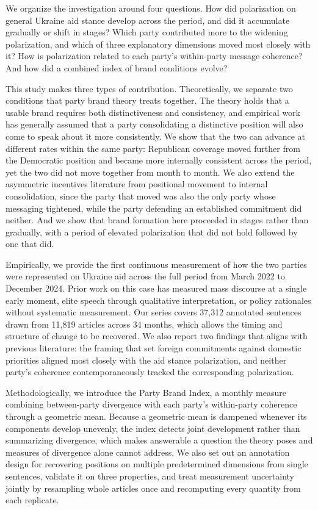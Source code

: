 We organize the investigation around four questions. How did polarization on general Ukraine aid stance develop across the period, and did it accumulate gradually or shift in stages? Which party contributed more to the widening polarization, and which of three explanatory dimensions moved most closely with it? How is polarization related to each party's within-party message coherence? And how did a combined index of brand conditions evolve?

This study makes three types of contribution. Theoretically, we separate two conditions that party brand theory treats together. The theory holds that a usable brand requires both distinctiveness and consistency, and empirical work has generally assumed that a party consolidating a distinctive position will also come to speak about it more consistently. We show that the two can advance at different rates within the same party: Republican coverage moved further from the Democratic position and became more internally consistent across the period, yet the two did not move together from month to month. We also extend the asymmetric incentives literature from positional movement to internal consolidation, since the party that moved was also the only party whose messaging tightened, while the party defending an established commitment did neither. And we show that brand formation here proceeded in stages rather than gradually, with a period of elevated polarization that did not hold followed by one that did.

Empirically, we provide the first continuous measurement of how the two parties were represented on Ukraine aid across the full period from March 2022 to December 2024. Prior work on this case has measured mass discourse at a single early moment, elite speech through qualitative interpretation, or policy rationales without systematic measurement. Our series covers 37,312 annotated sentences drawn from 11,819 articles across 34 months, which allows the timing and structure of change to be recovered. We also report two findings that aligns with previous literature: the framing that set foreign commitments against domestic priorities aligned most closely with the aid stance polarization, and neither party's coherence contemporaneously tracked the corresponding polarization.

Methodologically, we introduce the Party Brand Index, a monthly measure combining between-party divergence with each party's within-party coherence through a geometric mean. Because a geometric mean is dampened whenever its components develop unevenly, the index detects joint development rather than summarizing divergence, which makes answerable a question the theory poses and measures of divergence alone cannot address. We also set out an annotation design for recovering positions on multiple predetermined dimensions from single sentences, validate it on three properties, and treat measurement uncertainty jointly by resampling whole articles once and recomputing every quantity from each replicate.

